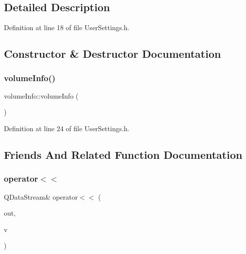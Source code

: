 \subsection{Detailed Description}


Definition at line 18 of file User\+Settings.\+h.



\subsection{Constructor \& Destructor Documentation}
\mbox{\label{structvolume_info_a13ce8308954665539c5aad9d6ab623d4}} 
\subsubsection{\texorpdfstring{volume\+Info()}{volumeInfo()}}
{\footnotesize\ttfamily volume\+Info\+::volume\+Info (\begin{DoxyParamCaption}{ }\end{DoxyParamCaption})\hspace{0.3cm}{\ttfamily [inline]}}



Definition at line 24 of file User\+Settings.\+h.



\subsection{Friends And Related Function Documentation}
\mbox{\label{structvolume_info_a0ebfb5cce6a4d9f825b4a0fe6c807216}} 
\subsubsection{\texorpdfstring{operator$<$$<$}{operator<<}}
{\footnotesize\ttfamily Q\+Data\+Stream\& operator$<$$<$ (\begin{DoxyParamCaption}\item[{Q\+Data\+Stream \&}]{out,  }\item[{const \hyperlink{structvolume_info}{volume\+Info} \&}]{v }\end{DoxyParamCaption})\hspace{0.3cm}{\ttfamily [friend]}}


